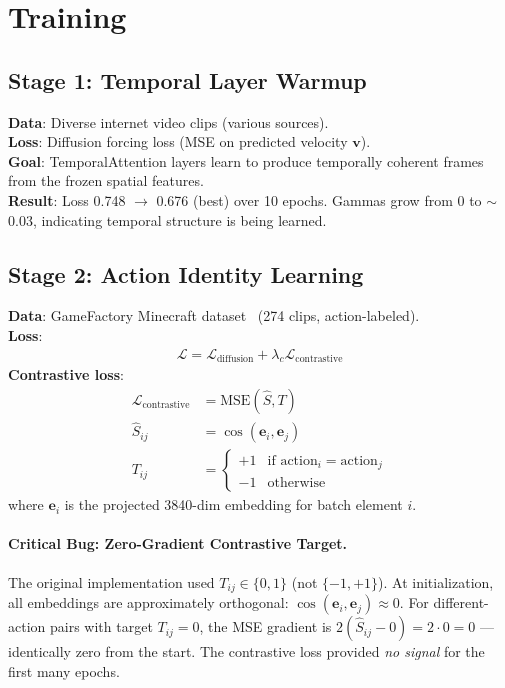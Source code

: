\documentclass[10pt,twocolumn]{article}
\begin{document}
\section{Training}

\subsection{Stage 1: Temporal Layer Warmup}

\textbf{Data}: Diverse internet video clips (various sources).\\
\textbf{Loss}: Diffusion forcing loss (MSE on predicted velocity $\mathbf{v}$).\\
\textbf{Goal}: TemporalAttention layers learn to produce temporally coherent frames from the frozen spatial features.\\
\textbf{Result}: Loss 0.748 $\to$ 0.676 (best) over 10 epochs. Gammas grow from 0 to $\sim$0.03, indicating temporal structure is being learned.

\subsection{Stage 2: Action Identity Learning}

\textbf{Data}: GameFactory Minecraft dataset~\cite{wang2024gamefactory} (274 clips, action-labeled).\\
\textbf{Loss}:
\begin{align}
  \mathcal{L} = \mathcal{L}_\text{diffusion} + \lambda_c \mathcal{L}_\text{contrastive}
\end{align}
\textbf{Contrastive loss}:
\begin{align}
  \mathcal{L}_\text{contrastive} &= \text{MSE}(\hat{S}, T) \\
  \hat{S}_{ij} &= \cos(\mathbf{e}_i, \mathbf{e}_j) \\
  T_{ij} &= \begin{cases} +1 & \text{if action}_i = \text{action}_j \\ -1 & \text{otherwise} \end{cases}
\end{align}
where $\mathbf{e}_i$ is the projected 3840-dim embedding for batch element $i$.

\paragraph{Critical Bug: Zero-Gradient Contrastive Target.}
The original implementation used $T_{ij} \in \{0, 1\}$ (not $\{-1, +1\}$). At initialization, all embeddings are approximately orthogonal: $\cos(\mathbf{e}_i, \mathbf{e}_j) \approx 0$. For different-action pairs with target $T_{ij} = 0$, the MSE gradient is $2(\hat{S}_{ij} - 0) = 2 \cdot 0 = 0$ --- identically zero from the start. The contrastive loss provided \emph{no signal} for the first many epochs.
\end{document}
